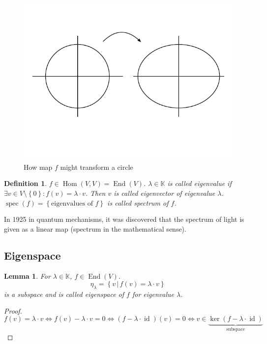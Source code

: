 \documentclass{article}
\newtheorem{definition}{Definition}  \numberwithin{definition}{section}
\newtheorem{lemma}{Lemma}  \numberwithin{lemma}{section}
\newcommand{\set}[1]{\left\{#1\right\}}
\newcommand{\setdef}[2]{\left\{\left.#1\,\right|\,#2\right\}}
\begin{document}
\begin{figure}[t]
  \begin{center}
    \includegraphics{img/15_screwing_map.pdf}
    \caption{How map $f$ might transform a circle}
  \end{center}
\end{figure}

\begin{definition} %
  $f \in \operatorname{Hom}(V, V) = \operatorname{End}(V)$.
  $\lambda \in \mathbb K$ is called \emph{eigenvalue} if
  $\exists v \in V \setminus \set{0}: f(v) = \lambda \cdot v$.
  Then $v$ is called \emph{eigenvector} of eigenvalue $\lambda$.
  $\operatorname{spec}(f) = \set{\text{eigenvalues of } f}$ is called \emph{spectrum of $f$}.
\end{definition}

In 1925 in quantum mechanisms, it was discovered that the spectrum of light is given as a linear map (spectrum in the mathematical sense).

\subsection{Eigenspace}

\begin{lemma}
  For $\lambda \in \mathbb K$, $f \in \operatorname{End}(V)$.
  \[ \eta_{\lambda} = \setdef{v}{f(v) = \lambda \cdot v} \]
  is a subspace and is called eigenspace of $f$ for eigenvalue $\lambda$.
\end{lemma}
\begin{proof}
  \[  f(v) = \lambda \cdot v \iff f(v) - \lambda \cdot v = 0
      \iff (f - \lambda \cdot \operatorname{id}) (v) = 0
      \iff v \in \underbrace{\operatorname{ker}(f - \lambda \cdot \operatorname{id})}_{\text{subspace}}
  \]
\end{proof}
\end{document}
